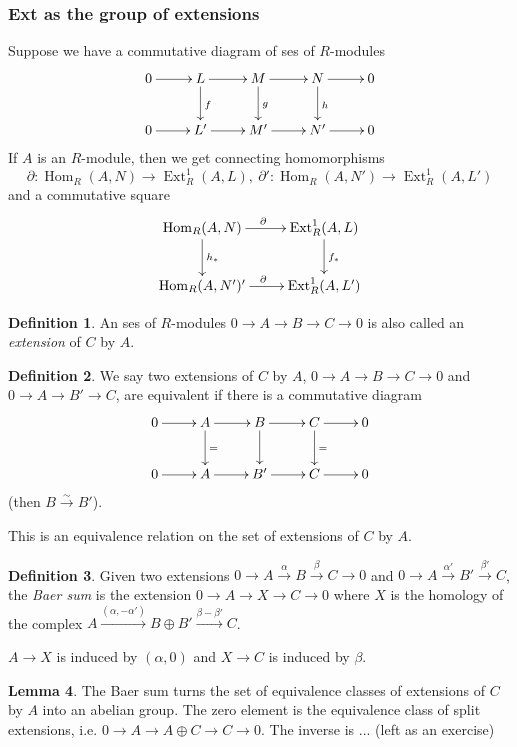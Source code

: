 \documentclass{article}
\newcommand{\Hom}{\operatorname{Hom}}
\newcommand{\Ext}{\operatorname{Ext}}
\theoremstyle{definition}
\newtheorem{defn}{Definition}[subsection]
\newtheorem{lemma}[defn]{Lemma}
\begin{document}
\subsubsection{Ext as the group of extensions}
Suppose we have a commutative diagram of ses of $R$-modules
\[
\xymatrix{
0\ar[r] & L\ar[r]\ar[d]^f & M\ar[r]\ar[d]^g & N\ar[r]\ar[d]^h & 0 \\
0\ar[r] & L'\ar[r] & M'\ar[r] & N'\ar[r] & 0 
}
\]
If $A$ is an $R$-module, then we get connecting homomorphisms
\[
\partial:\Hom_R(A,N)\rightarrow\Ext_R^1(A,L),\ \partial':\Hom_R(A,N')\rightarrow\Ext_R^1(A,L')
\]
and a commutative square
\[
\xymatrix{
\Hom_R(A,N)\ar[r]^\partial\ar[d]^{h_\ast} & \Ext_R^1(A,L)\ar[d]^{f_\ast} \\
\Hom_R(A,N')\ar[r]^\partial' & \Ext_R^1(A,L')
}
\]

\begin{defn}
An ses of $R$-modules $0\rightarrow A\rightarrow B\rightarrow C\rightarrow 0$ is also called an \textit{extension} of $C$ by $A$.
\end{defn}

\begin{defn}
We say two extensions of $C$ by $A$, $0\rightarrow A\rightarrow B\rightarrow C\rightarrow 0$ and $0\rightarrow A\rightarrow B'\rightarrow C$, are equivalent if there is a commutative diagram
\[
\xymatrix{
0\ar[r] & A\ar[r]\ar[d]^= & B\ar[r]\ar[d] & C\ar[r]\ar[d]^= & 0 \\
0\ar[r] & A\ar[r] & B'\ar[r] & C\ar[r] & 0 
}
\]
(then $B\xrightarrow{\sim}B'$).

This is an equivalence relation on the set of extensions of $C$ by $A$.
\end{defn}

\begin{defn}
Given two extensions $0\rightarrow A\xrightarrow{\alpha} B\xrightarrow{\beta} C\rightarrow 0$ and $0\rightarrow A\xrightarrow{\alpha'} B'\xrightarrow{\beta'} C$, the \textit{Baer sum} is the extension $0\rightarrow A\rightarrow X\rightarrow C\rightarrow 0$ where $X$ is the homology of the complex $A\xrightarrow{(\alpha,-\alpha')}B\oplus B'\xrightarrow{\beta-\beta'}C$.

$A\rightarrow X$ is induced by $(\alpha,0)$ and $X\rightarrow C$ is induced by $\beta$.
\end{defn}

\begin{lemma}
The Baer sum turns the set of equivalence classes of extensions of $C$ by $A$ into an abelian group. The zero element is the equivalence class of split extensions, i.e. $0\rightarrow A\rightarrow A\oplus C\rightarrow C\rightarrow 0$. The inverse is ... (left as an exercise)
\end{lemma}
\end{document}

